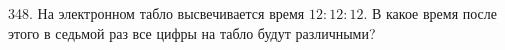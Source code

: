 348. На электронном табло высвечивается время $12:12:12.$ В какое время после этого в седьмой раз все цифры на табло будут различными?\\
